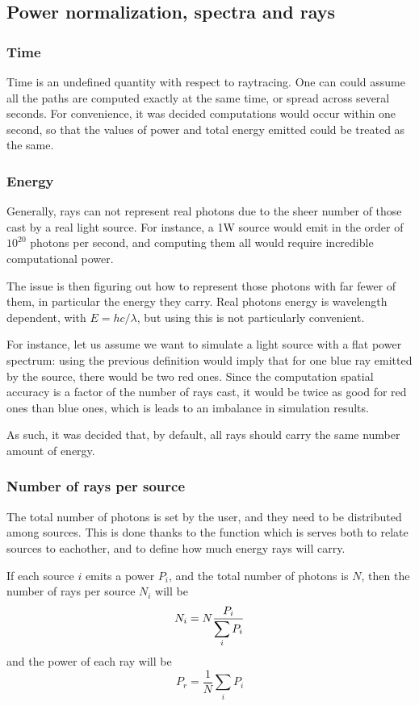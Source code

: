 \subsection{Power normalization, spectra and rays}

\subsubsection{Time}

Time is an undefined quantity with respect to raytracing. One can could assume all the paths are computed exactly at the same time, or spread across several seconds. For convenience, it was decided computations would occur within one second, so that the values of power and total energy emitted could be treated as the same.

\subsubsection{Energy}

Generally, rays can not represent real photons due to the sheer number of those cast by a real light source. For instance, a 1W source would emit in the order of $10^{20}$ photons per second, and computing them all would require incredible computational power.

The issue is then figuring out how to represent those photons with far fewer of them, in particular the energy they carry. Real photons energy is wavelength dependent, with $E=hc/\lambda$, but using this is not particularly convenient.

For instance, let us assume we want to simulate a light source with a flat power spectrum: using the previous definition would imply that for one blue ray emitted by the source, there would be two red ones. Since the computation spatial accuracy is a factor of the number of rays cast, it would be twice as good for red ones than blue ones, which is leads to an imbalance in simulation results.

As such, it was decided that, by default, all rays should carry the same number amount of energy.

\subsubsection{Number of rays per source}

The total number of photons is set by the user, and they need to be distributed among sources. This is done thanks to the  function which is serves both to relate sources to eachother, and to define how much energy rays will carry.

If each source $i$ emits a power $P_i$, and the total number of photons is $N$, then the number of rays per source $N_i$ will be
\begin{equation}
	N_i=N\frac{P_i}{\displaystyle \sum_i P_i}
\end{equation}
and the power of each ray will be
\begin{equation}
	P_r=\frac{1}{N} \sum_i P_i
\end{equation}